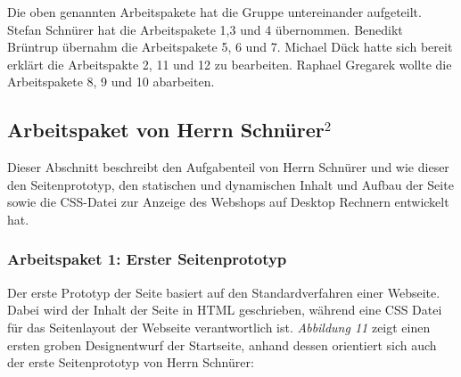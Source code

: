 Die oben genannten Arbeitspakete hat die Gruppe untereinander aufgeteilt. Stefan Schnürer hat die Arbeitspakete 1,3 und 4 übernommen. Benedikt Brüntrup übernahm die Arbeitspakete 5, 6 und 7. Michael Dück hatte sich bereit erklärt die Arbeitspakte 2, 11 und 12 zu bearbeiten. Raphael Gregarek wollte die Arbeitspakete 8, 9 und 10 abarbeiten.



\newpage
\subsection{Arbeitspaket von Herrn Schnürer$^2$}

Dieser Abschnitt beschreibt den Aufgabenteil von Herrn Schnürer und wie dieser den Seitenprototyp, den statischen und dynamischen Inhalt und Aufbau der Seite sowie die CSS-Datei zur Anzeige des Webshops auf Desktop Rechnern entwickelt hat.


\subsubsection{Arbeitspaket 1: Erster Seitenprototyp}

Der erste Prototyp der Seite basiert auf den Standardverfahren einer Webseite. Dabei wird der Inhalt der Seite in HTML geschrieben, während eine CSS Datei für das Seitenlayout der Webseite verantwortlich ist. \textit{Abbildung 11} zeigt einen ersten groben Designentwurf der Startseite, anhand dessen orientiert sich auch der erste Seitenprototyp von Herrn Schnürer:

